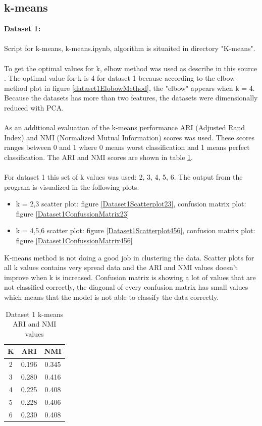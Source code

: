 \documentclass[12pt]{report}
\begin{document}
	\subsection{k-means}
	\textbf{Dataset 1:}\\
	\\
	Script for k-means, k-means.ipynb, algorithm is situaited in directory "K-means".\\
	\\
	To get the optimal values for k, elbow method was used as describe in this source \cite{K-means}. The optimal value for k is 4 for dataset 1 because according to the elbow method plot in figure \ref{dataset1ElobowMethod}, the "elbow" appears when k = 4. Because the datasets has more than two features, the datasets were dimensionally reduced with PCA. \\
	\\
	As an additional evaluation of the k-means performance ARI (Adjusted Rand Index) and NMI (Normalized Mutual Information) scores was used. These scores ranges between 0 and 1 where 0 means worst classification and 1 means perfect classification. The ARI and NMI scores are shown in table \ref{dataset1k-meansARINMI}.\\
	\\
	For dataset 1 this set of k values was used: 2, 3, 4, 5, 6. The output from the program is visualized in the following plots:
	\begin{itemize}
		\item k = 2,3 scatter plot: figure \ref{Dataset1Scatterplot23}, confusion matrix plot: figure \ref{Dataset1ConfussionMatrix23} 
		\item k = 4,5,6 scatter plot: figure \ref{Dataset1Scatterplot456}, confusion matrix plot: figure \ref{Dataset1ConfussionMatrix456}
	\end{itemize}
	K-means method is not doing a good job in clustering the data. Scatter plots for all k values contains very spread data and the ARI and NMI values doesn't improve when k is increased. Confusion matrix is showing a lot of values that are not classified correctly, the diagonal of every confusion matrix has small values which means that the model is not able to classify the data correctly.
	\begin{table}[H]
		\centering
		\begin{tabular}{|c|c|c|}
			\hline
			K & ARI & NMI \\
			\hline
			2 & 0.196 & 0.345 \\
			\hline
			3 & 0.280 & 0.416 \\
			\hline
			4 & 0.225 & 0.408 \\
			\hline
			5 & 0.228 & 0.406 \\
			\hline
			6 & 0.230 & 0.408 \\
			\hline
		\end{tabular}
		\caption{Dataset 1 k-means ARI and NMI values}
		\label{dataset1k-meansARINMI}
	\end{table}
\end{document}
